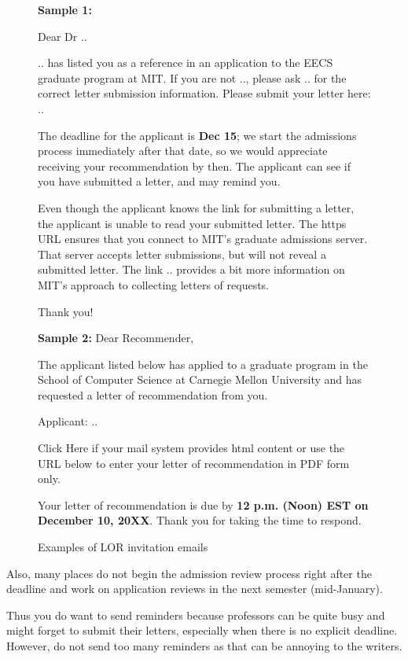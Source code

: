 \documentclass[oneside,11pt,dvipsnames]{book}
\newenvironment{emphasisbox}[1][]{
  \small
  \begin{myemphasisbox}
    {\small \textbf{#1}}
  }{
  \end{myemphasisbox}
}
\begin{document}
\begin{figure}
\begin{emphasisbox}
    \textbf{Sample 1:}
    
    Dear Dr ..
    
    .. has listed you as a reference in an application to the EECS graduate program at MIT. If you are not .., please ask .. for the correct letter submission information. Please submit your letter here: ..
    
    The deadline for the applicant is \textbf{Dec 15}; we start the admissions process immediately after that date, so we would appreciate receiving your recommendation by then. The applicant can see if you have submitted a letter, and may remind you.
    
    Even though the applicant knows the link for submitting a letter, the applicant is unable to read your submitted letter. The https URL ensures that you connect to MIT's graduate admissions server. That server accepts letter submissions, but will not reveal a submitted letter. The link .. provides a bit more information on MIT's approach to collecting letters of requests.
    
    Thank you!
    
    \textbf{Sample 2:}
    Dear Recommender,
    
    The applicant listed below has applied to a graduate program in the School of Computer Science at Carnegie Mellon University and has requested a letter of recommendation from you.
    
    Applicant: ..
    
    Click Here if your mail system provides html content or use the URL below to enter your letter of recommendation in PDF form only.
    
    Your letter of recommendation is due by \textbf{12 p.m. (Noon) EST on December 10, 20XX}. Thank you for taking the time to respond.
\end{emphasisbox}
\caption{Examples of LOR invitation emails}\label{fig:lor-invitations}
\end{figure}


Also, many places do not begin the admission review process right after the deadline and work on application reviews in the next semester (mid-January). 

Thus you do want to send reminders because professors can be quite busy and might forget to submit their letters, especially when there is no explicit deadline. However, do not send too many reminders as that can be annoying to the writers.
\end{document}
